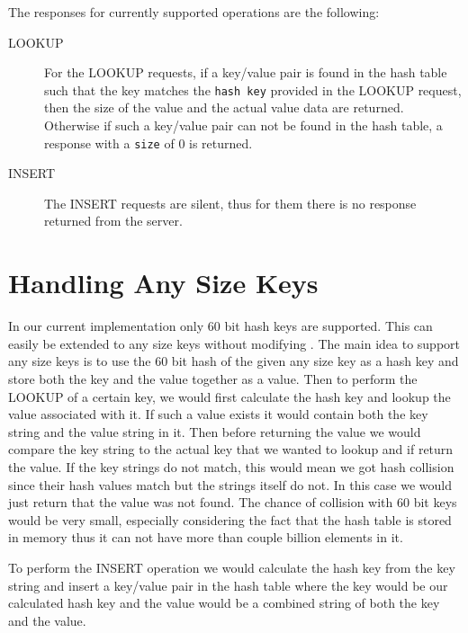 The responses for currently supported operations are the following:
\begin{description}
\item[LOOKUP] For the LOOKUP requests, if a key/value pair is found in the hash table such that the key matches
the \texttt{hash key} provided in the LOOKUP request, then the size of the value and the actual value data are returned.
Otherwise if such a key/value pair can not be found in the hash table, a response with a \texttt{size} of 0 is
returned.
\item[INSERT] The INSERT requests are silent, thus for them there is no response returned from the server.
\end{description}

\section{Handling Any Size Keys}
\label{sec:anykey}

In our current implementation only 60 bit hash keys are supported. This can easily be extended to any size keys
without modifying \cpserver{}. The main idea to support any size keys is to use the 60 bit hash of the given any size key as a hash key and store both the 
key and the value together as a value. Then to perform the LOOKUP of a certain key, we would first calculate the hash key
and lookup the value associated with it. If such a value exists it would contain both the key string and the value string in
it. Then before returning the value we would compare the key string to the actual key that we wanted to lookup and if
return the value. If the key strings do not match, this would mean we got hash collision since their hash values match but the 
strings itself do not. In this case we would just return that the value was not found. The chance of collision with 60 bit keys 
would be very small, especially considering the fact that the hash table is stored in memory thus it can not have more than 
couple billion elements in it.

To perform the INSERT operation we would calculate the hash key from the key string and insert a key/value pair in the hash table
where the key would be our calculated hash key and the value would be a combined string of both the key and the value.

